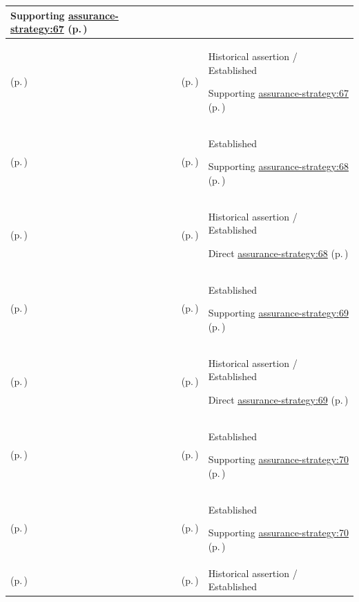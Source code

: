 \begin{longtable}{|>{\raggedright\arraybackslash}p{0.27\TableWidth}|>{\raggedright\arraybackslash}p{0.27\TableWidth}|>{\raggedright\arraybackslash}p{0.46\TableWidth}|}
Supporting \hyperref[rad:assurance-strategy:58]{assurance-strategy:67} (p.\,\pageref{rad:assurance-strategy:58})\\\hline
\nameref{cap:bec-governed-assurance} (p.\,\pageref{cap:bec-governed-assurance}) & \nameref{cap:ec-08} (p.\,\pageref{cap:ec-08}) & Historical assertion / Established

Supporting \hyperref[rad:assurance-strategy:58]{assurance-strategy:67} (p.\,\pageref{rad:assurance-strategy:58})\\\hline
\nameref{cap:bec-assurance-design} (p.\,\pageref{cap:bec-assurance-design}) & \nameref{cap:ec-09} (p.\,\pageref{cap:ec-09}) & Established

Supporting \hyperref[rad:assurance-strategy:58]{assurance-strategy:68} (p.\,\pageref{rad:assurance-strategy:58})\\\hline
\nameref{cap:bec-governed-assurance} (p.\,\pageref{cap:bec-governed-assurance}) & \nameref{cap:ec-09} (p.\,\pageref{cap:ec-09}) & Historical assertion / Established

Direct \hyperref[rad:assurance-strategy:58]{assurance-strategy:68} (p.\,\pageref{rad:assurance-strategy:58})\\\hline
\nameref{cap:bec-assurance-design} (p.\,\pageref{cap:bec-assurance-design}) & \nameref{cap:ec-10} (p.\,\pageref{cap:ec-10}) & Established

Supporting \hyperref[rad:assurance-strategy:58]{assurance-strategy:69} (p.\,\pageref{rad:assurance-strategy:58})\\\hline
\nameref{cap:bec-governed-assurance} (p.\,\pageref{cap:bec-governed-assurance}) & \nameref{cap:ec-10} (p.\,\pageref{cap:ec-10}) & Historical assertion / Established

Direct \hyperref[rad:assurance-strategy:58]{assurance-strategy:69} (p.\,\pageref{rad:assurance-strategy:58})\\\hline
\nameref{cap:bec-assurance-design} (p.\,\pageref{cap:bec-assurance-design}) & \nameref{cap:ec-11} (p.\,\pageref{cap:ec-11}) & Established

Supporting \hyperref[rad:assurance-strategy:58]{assurance-strategy:70} (p.\,\pageref{rad:assurance-strategy:58})\\\hline
\nameref{cap:bec-assurance-criteria-management} (p.\,\pageref{cap:bec-assurance-criteria-management}) & \nameref{cap:ec-11} (p.\,\pageref{cap:ec-11}) & Established

Supporting \hyperref[rad:assurance-strategy:58]{assurance-strategy:70} (p.\,\pageref{rad:assurance-strategy:58})\\\hline
\nameref{cap:bec-governed-assurance} (p.\,\pageref{cap:bec-governed-assurance}) & \nameref{cap:ec-11} (p.\,\pageref{cap:ec-11}) & Historical assertion / Established


\end{longtable}
